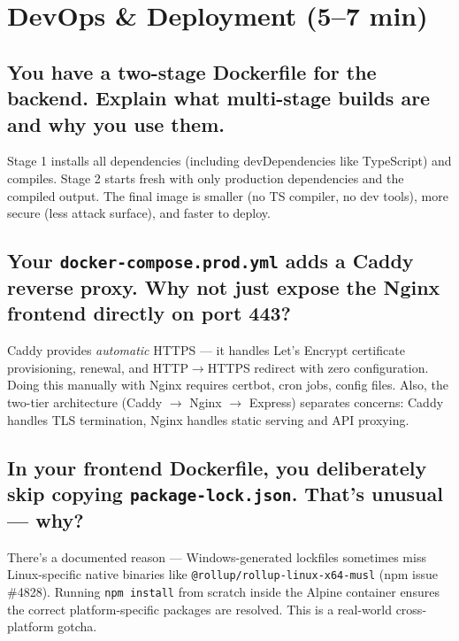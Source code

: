 \documentclass[12pt, a4paper]{article}
\begin{document}
\newpage

\section{DevOps \& Deployment \textnormal{\textcolor{slatelight}{(5--7 min)}}}

\subsection{You have a two-stage Dockerfile for the backend. Explain what multi-stage builds are and why you use them.}

\begin{listenfor}
Stage 1 installs all dependencies (including devDependencies like TypeScript) and compiles. Stage 2 starts fresh with only production dependencies and the compiled output. The final image is smaller (no TS compiler, no dev tools), more secure (less attack surface), and faster to deploy.
\end{listenfor}

\subsection{Your \texttt{docker-compose.prod.yml} adds a Caddy reverse proxy. Why not just expose the Nginx frontend directly on port 443?}

\begin{listenfor}
Caddy provides \emph{automatic} HTTPS — it handles Let's Encrypt certificate provisioning, renewal, and HTTP$\rightarrow$HTTPS redirect with zero configuration. Doing this manually with Nginx requires certbot, cron jobs, config files. Also, the two-tier architecture (Caddy $\rightarrow$ Nginx $\rightarrow$ Express) separates concerns: Caddy handles TLS termination, Nginx handles static serving and API proxying.
\end{listenfor}

\subsection{In your frontend Dockerfile, you deliberately skip copying \texttt{package-lock.json}. That's unusual — why?}

\begin{listenfor}
There's a documented reason — Windows-generated lockfiles sometimes miss Linux-specific native binaries like \texttt{@rollup/rollup-linux-x64-musl} (npm issue \#4828). Running \texttt{npm install} from scratch inside the Alpine container ensures the correct platform-specific packages are resolved. This is a real-world cross-platform gotcha.
\end{listenfor}
\end{document}
